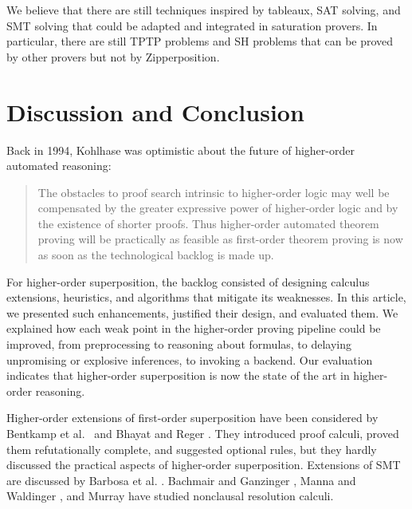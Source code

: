 \documentclass[smallcondensed,draft]{svjour3}     %
\begin{document}
We believe that there are still techniques inspired by
tableaux, SAT solving, and SMT solving that could be adapted and integrated in
saturation provers. In particular, there are still  TPTP problems
and  SH problems that can be proved by other provers but not by
Zipperposition.

\section{Discussion and Conclusion}
\label{sec:ho-tech:discussion}


\begin{sloppypar}
Back in 1994, Kohlhase \cite[Sect.~1.3]{mk-94-hores} was optimistic about the
future of higher-order automated reasoning:
%
\begin{quote}
  The obstacles to proof search intrinsic
  to higher-order logic may well be compensated by the greater expressive power
  of higher-order logic and by the existence of shorter proofs. Thus
  higher-order automated theorem proving will be practically as feasible as
  first-order theorem proving is now as soon as the technological backlog is made up.
\end{quote}
%
For higher-order superposition, the backlog consisted of designing calculus
extensions, heuristics, and algorithms that mitigate its weaknesses. In
this article, we presented such enhancements, justified their design, and
evaluated them. We explained how each weak point in the
higher-order proving pipeline could be improved, from preprocessing to reasoning
about formulas, to delaying unpromising or explosive inferences, to invoking a
backend. Our evaluation indicates that higher-order superposition is now the
state of the art in higher-order reasoning.
\end{sloppypar}

Higher-order extensions of first-order superposition have been
considered %
by Bentkamp et al.\
\cite{bbtvw-21-sup-lam, bbcw-21-lfho} and Bhayat and Reger
\cite{br-19-restricted-unif, br-20-full-sup-w-combs}. They introduced proof calculi,
proved them refutationally complete, and suggested optional rules, but
they hardly discussed the practical aspects of higher-order superposition. Extensions
of SMT are discussed by Barbosa et al. \cite{brotb-19-ho-smt}.
Bachmair and Ganzinger \cite{bg-1992-nonclausal}, Manna and Waldinger
\cite{mw-1979-nonclausal}, and Murray \cite{nm-1982-nonclausal} have studied
nonclausal resolution calculi.
\end{document}
